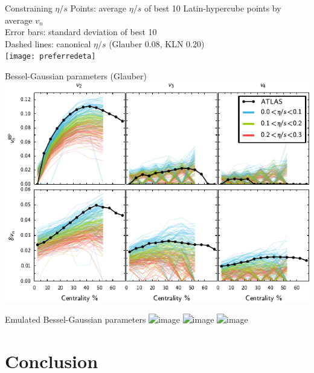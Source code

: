 \documentclass{beamer}
\begin{document}
\begin{frame}{Constraining $\eta/s$}
  \vspace{3mm}
  \small
  Points:  average $\eta/s$ of best 10 Latin-hypercube points by average $v_n$ \\
  Error bars:  standard deviation of best 10 \\
  Dashed lines:  canonical $\eta/s$ (Glauber 0.08, KLN 0.20) \\[1em]
  \texttt{[image: preferredeta]}
\end{frame}



\begin{frame}{Bessel-Gaussian parameters (Glauber)}
  \vspace{3mm}
  \includegraphics{bgparams}
\end{frame}


\begin{frame}{Emulated Bessel-Gaussian parameters}
  \vspace{3mm}
  \includegraphics<1>{emu0}
  \includegraphics<2>{emu1}
  \includegraphics<3>{emu2}
\end{frame}


\section{Conclusion}
\end{document}
